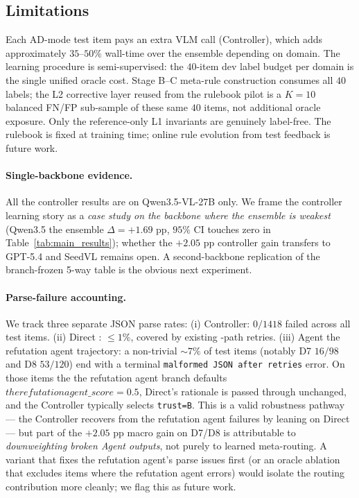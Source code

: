 \subsection{Limitations}
\label{ssec:ctrl_limits}

Each AD-mode test item pays an extra VLM call (Controller), which
adds approximately $35$--$50\%$ wall-time over the ensemble depending on
domain. The learning procedure is semi-supervised: the $40$-item
dev label budget per domain is the single unified oracle cost.
Stage B--C meta-rule construction consumes all $40$ labels; the L2
corrective layer reused from the rulebook pilot is a $K{=}10$
balanced FN/FP sub-sample of these same $40$ items, not additional
oracle exposure. Only the reference-only L1 invariants are
genuinely label-free. The rulebook is fixed at training time;
online rule evolution from test feedback is future work.
\paragraph{Single-backbone evidence.}
All the controller results are on Qwen3.5-VL-27B only. We frame the controller
learning story as a \emph{case study on the backbone where the ensemble is
weakest} (Qwen3.5 the ensemble $\Delta=+1.69$ pp, $95\%$ CI touches zero in
Table~\ref{tab:main_results}); whether the $+2.05$ pp controller gain
transfers to GPT-5.4 and SeedVL remains open. A second-backbone
replication of the branch-frozen 5-way table is the obvious next
experiment.

\paragraph{Parse-failure accounting.}
We track three separate JSON parse rates:
(i) Controller: $0/1418$ failed across all test items.
(ii) Direct : $\le 1\%$, covered by existing -path retries.
(iii) Agent the refutation agent trajectory: a non-trivial $\sim\!7\%$ of test items
(notably D7 $16/98$ and D8 $53/120$) end with a terminal
\texttt{malformed JSON after retries} error. On those items the
the refutation agent branch defaults $the refutation agent\_score{=}0.5$, Direct's rationale is
passed through unchanged, and the Controller typically selects
\texttt{trust=B}. This is a valid robustness pathway --- the
Controller recovers from the refutation agent failures by leaning on Direct --- but
part of the $+2.05$ pp macro gain on D7/D8 is attributable to
\emph{downweighting broken Agent outputs}, not purely to learned
meta-routing. A variant that fixes the refutation agent's parse issues first (or
an oracle ablation that excludes items where the refutation agent errors) would
isolate the routing contribution more cleanly; we flag this as
future work.
